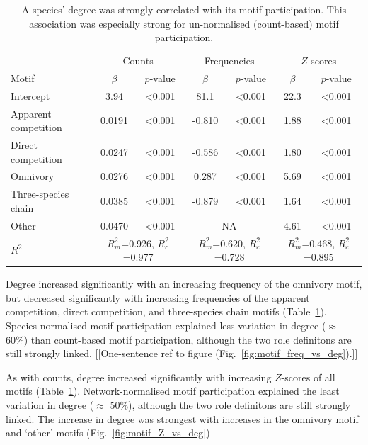 \documentclass[12pt]{article}
\begin{document}
\begin{spacing}{2.0}
			\begin{table}[h!]
			\caption{A species' degree was strongly correlated with its motif participation. This association was especially strong for un-normalised (count-based) motif participation.}
			\label{tab:motifs_vs_deg}
			\begin{tabular}{l | c c | c c | c c}
			& \multicolumn{2}{|c|}{Counts} & \multicolumn{2}{c}{Frequencies} & \multicolumn{2}{|c}{$Z$-scores} \\
			Motif & $\beta$ & $p$-value & $\beta$ & $p$-value & $\beta$ & $p$-value \\
			\hline
			Intercept &  3.94  & \textless0.001 & 81.1 & \textless0.001 & 22.3 & \textless0.001\\
			\hline
			Apparent competition       &  0.0191  & \textless0.001 & -0.810 & \textless0.001 & 1.88 & \textless0.001 \\
			Direct competition       &  0.0247  & \textless0.001 & -0.586 & \textless0.001 & 1.80 & \textless0.001\\
			Omnivory       &  0.0276  & \textless0.001 & 0.287 & \textless0.001 & 5.69 & \textless0.001\\
			Three-species chain       &  0.0385  & \textless0.001 & -0.879 & \textless0.001 & 1.64 & \textless0.001\\
			Other    &  0.0470  & \textless0.001 & \multicolumn{2}{c|}{NA} & 4.61 & \textless0.001 \\
			\hline
			$R^2$ & \multicolumn{2}{|c|}{$R^2_m$=0.926, $R^2_c$=0.977} & 
			\multicolumn{2}{c}{$R^2_m$=0.620, $R^2_c$=0.728} & 
			\multicolumn{2}{|c}{$R^2_m$=0.468, $R^2_c$=0.895} \\
			\end{tabular}
			\end{table}


			Degree increased significantly with an increasing frequency of the omnivory motif, but decreased significantly with increasing frequencies of the apparent competition, direct competition, and three-species chain motifs (Table~\ref{tab:motifs_vs_deg}).
			Species-normalised motif participation explained less variation in degree ($\approx$ 60\%) than count-based motif participation, although the two role definitons are still strongly linked.
			[[One-sentence ref to figure (Fig.~\ref{fig:motif_freq_vs_deg}).]]


			As with counts, degree increased significantly with increasing $Z$-scores of all motifs (Table~\ref{tab:motifs_vs_deg}).
			Network-normalised motif participation explained the least variation in degree ($\approx$ 50\%), although the two role definitons are still strongly linked.
			The increase in degree was strongest with increases in the omnivory motif and `other' motifs (Fig.~\ref{fig:motif_Z_vs_deg})



\end{spacing}
\end{document}
